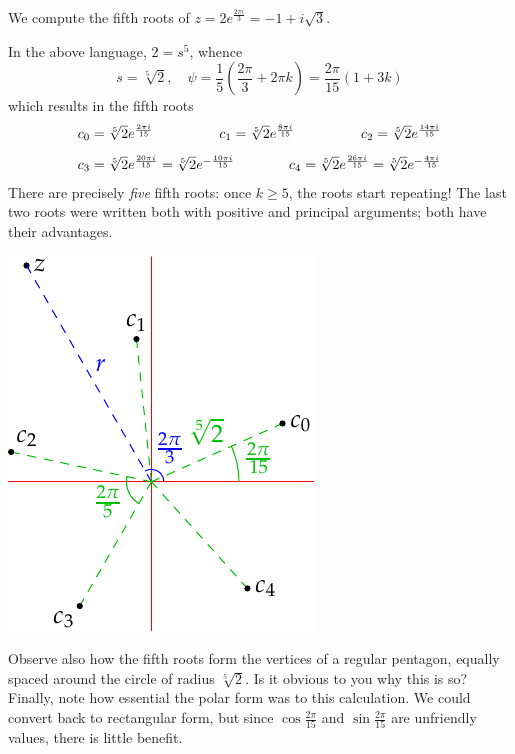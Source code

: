 \begin{example}{}{}
	We compute the fifth roots of $z=2e^{\frac{2\pi i}3}=-1+i\sqrt 3$.\par
	\begin{minipage}[t]{0.65\linewidth}\vspace{-4pt}
		In the above language, $2=s^5$, whence
		\[
			s=\sqrt[5]{2},\quad \psi=\frac 15\left(\frac{2\pi}3+2\pi k\right)=\frac{2\pi}{15}(1+3k)
		\]
		which results in the fifth roots
		\begin{gather*}
			\makebox[260pt][s]{$c_0=\sqrt[5]{2}\polar{2\pi i}{15}\hfill
			c_1=\sqrt[5]{2}\polar{8\pi i}{15}\hfill
			c_2=\sqrt[5]{2}\polar{14\pi i}{15}$}\\[5pt]
			\makebox[260pt][s]{$c_3=\sqrt[5]{2}\polar{20\pi i}{15} =\sqrt[5]{2}\polarn{10\pi i}{15}\hfill
			c_4=\sqrt[5]{2}\polar{26\pi i}{15} =\sqrt[5]{2}\polarn{4\pi i}{15}$}
		\end{gather*}
		There are precisely \emph{five} fifth roots: once $k\ge 5$, the roots start repeating! The last two roots were written both with positive and principal arguments; both have their advantages.
	\end{minipage}
	\hfill
	\begin{minipage}[t]{0.34\linewidth}\vspace{-20pt}
		\flushright\includegraphics{intro-roots}
	\end{minipage}
	\medbreak
	Observe also how the fifth roots form the vertices of a regular pentagon, equally spaced around the circle of radius $\sqrt[5]{2}$. Is it obvious to you why this is so?\smallbreak
	Finally, note how essential the polar form was to this calculation. We could convert back to rectangular form, but since $\cos\frac{2\pi}{15}$ and $\sin\frac{2\pi}{15}$ are unfriendly values, there is little benefit. 
\end{example}


